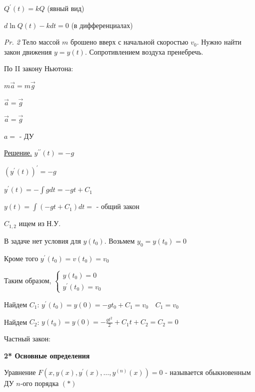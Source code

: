 \documentclass[12pt]{article}
\begin{document}
    $\displaystyle Q^\prime(t) = kQ$  (явный вид)

    $d \ln Q(t) - kdt = 0$ (в дифференциалах)

    \vspace{5mm}

    \textit{Pr. 2} \quad Тело массой $m$ брошено вверх с начальной скоростью $\displaystyle v_0$. Нужно найти закон движения $y = y(t)$.
    Сопротивлением воздуха пренебречь.

    По II закону Ньютона:

    $m\overrightarrow{a} = m\overrightarrow{g}$

    $\overrightarrow{a} = \overrightarrow{g}$

    $\overrightarrow{a} = \overrightarrow{g}$

    $a = $ - ДУ

    \underline{Решение.} \quad $\displaystyle y^{\prime\prime}(t) = -g$

    $\displaystyle (y^{\prime}(t))^\prime = -g$

    $\displaystyle y^{\prime}(t) = -\int g dt = -gt + C_1$

    $\displaystyle y(t) = \int (-gt + C_1) dt = $ - общий закон

    $\displaystyle C_{1,2}$ ищем из Н.У.

    В задаче нет условия для $\displaystyle y(t_0)$. Возьмем $\displaystyle y_0 = y(t_0) = 0$

    Кроме того $\displaystyle y^\prime(t_0) = v(t_0) = v_0$

    Таким образом, $\displaystyle \begin{cases}y(t_0) = 0 \\ y^\prime(t_0) = v_0\end{cases}$

    Найдем $\displaystyle C_1$: $\displaystyle y^\prime(t_0) = y(0) = -gt_0 + C_1 = v_0 \quad C_1 = v_0$

    Найдем $\displaystyle C_2$: $\displaystyle y(t_0) = y(0) = -\frac{gt^2}{2} + C_1 t + C_2 = C_2 = 0$

    Частный закон: 

    \vspace{5mm}

    \textbf{2* Основные определения}

     Уравнение $\displaystyle F(x, y(x), y^\prime(x), \dots, y^{(n)}(x)) = 0$ - называется обыкновенным ДУ $n$-ого порядка $(*)$
\end{document}
